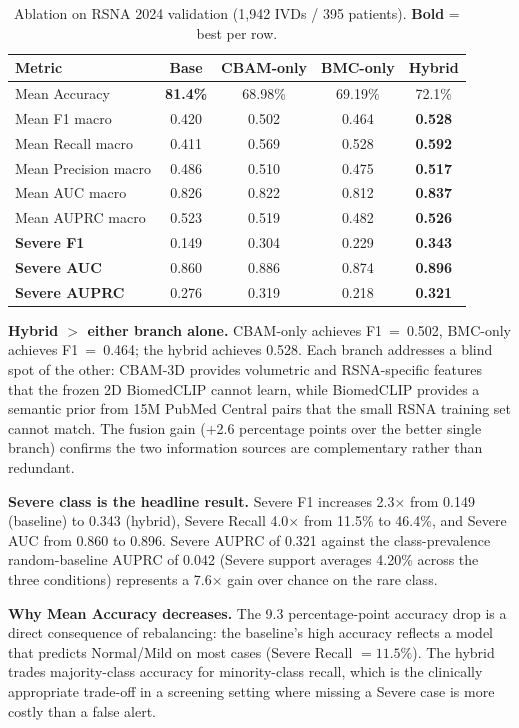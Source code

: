\documentclass[conference]{IEEEtran}
\newcommand{\best}[1]{\textcolor{best}{\textbf{#1}}}
\begin{document}
\begin{table}[t]
\centering
\caption{Ablation on RSNA 2024 validation (1{,}942 IVDs / 395 patients).
\textbf{Bold} = best per row.}
\label{tab:main}
\renewcommand{\arraystretch}{1.05}
\begin{tabular}{@{}lcccc@{}}
\toprule
Metric & Base & CBAM-only & BMC-only & \best{Hybrid} \\
\midrule
Mean Accuracy        & \best{81.4\%} & 68.98\% & 69.19\% & 72.1\% \\
Mean F1 macro        & 0.420 & 0.502 & 0.464 & \best{0.528} \\
Mean Recall macro    & 0.411 & 0.569 & 0.528 & \best{0.592} \\
Mean Precision macro & 0.486 & 0.510 & 0.475 & \best{0.517} \\
Mean AUC macro       & 0.826 & 0.822 & 0.812 & \best{0.837} \\
Mean AUPRC macro     & 0.523 & 0.519 & 0.482 & \best{0.526} \\
\midrule
\textbf{Severe F1}    & 0.149 & 0.304 & 0.229 & \best{0.343} \\
\textbf{Severe AUC}   & 0.860 & 0.886 & 0.874 & \best{0.896} \\
\textbf{Severe AUPRC} & 0.276 & 0.319 & 0.218 & \best{0.321} \\
\bottomrule
\end{tabular}
\end{table}

\textbf{Hybrid $>$ either branch alone.} CBAM-only achieves F1~=~0.502,
BMC-only achieves F1~=~0.464; the hybrid achieves 0.528. Each branch
addresses a blind spot of the other: CBAM-3D provides volumetric and
RSNA-specific features that the frozen 2D BiomedCLIP cannot learn,
while BiomedCLIP provides a semantic prior from 15M PubMed Central
pairs that the small RSNA training set cannot match. The fusion gain
(+2.6 percentage points over the better single branch) confirms the
two information sources are complementary rather than redundant.

\textbf{Severe class is the headline result.} Severe F1 increases
2.3$\times$ from 0.149 (baseline) to 0.343 (hybrid), Severe Recall
4.0$\times$ from 11.5\% to 46.4\%, and Severe AUC from 0.860 to 0.896.
Severe AUPRC of 0.321 against the class-prevalence random-baseline AUPRC
of 0.042 (Severe support averages 4.20\% across the three conditions)
represents a 7.6$\times$ gain over chance on the rare class.

\textbf{Why Mean Accuracy decreases.} The 9.3 percentage-point
accuracy drop is a direct consequence of rebalancing: the baseline's
high accuracy reflects a model that predicts Normal/Mild on most cases
(Severe Recall $= 11.5\%$). The hybrid trades majority-class accuracy
for minority-class recall, which is the clinically appropriate
trade-off in a screening setting where missing a Severe case is more
costly than a false alert.
\end{document}
